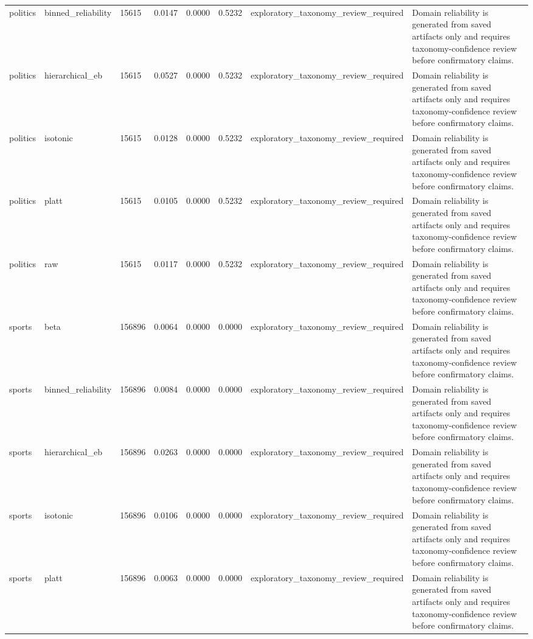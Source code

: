 \begin{tabular}{llllllll}
politics & binned\_reliability & 15615 & 0.0147 & 0.0000 & 0.5232 & exploratory\_taxonomy\_review\_required & Domain reliability is generated from saved artifacts only and requires taxonomy-confidence review before confirmatory claims. \\
politics & hierarchical\_eb & 15615 & 0.0527 & 0.0000 & 0.5232 & exploratory\_taxonomy\_review\_required & Domain reliability is generated from saved artifacts only and requires taxonomy-confidence review before confirmatory claims. \\
politics & isotonic & 15615 & 0.0128 & 0.0000 & 0.5232 & exploratory\_taxonomy\_review\_required & Domain reliability is generated from saved artifacts only and requires taxonomy-confidence review before confirmatory claims. \\
politics & platt & 15615 & 0.0105 & 0.0000 & 0.5232 & exploratory\_taxonomy\_review\_required & Domain reliability is generated from saved artifacts only and requires taxonomy-confidence review before confirmatory claims. \\
politics & raw & 15615 & 0.0117 & 0.0000 & 0.5232 & exploratory\_taxonomy\_review\_required & Domain reliability is generated from saved artifacts only and requires taxonomy-confidence review before confirmatory claims. \\
sports & beta & 156896 & 0.0064 & 0.0000 & 0.0000 & exploratory\_taxonomy\_review\_required & Domain reliability is generated from saved artifacts only and requires taxonomy-confidence review before confirmatory claims. \\
sports & binned\_reliability & 156896 & 0.0084 & 0.0000 & 0.0000 & exploratory\_taxonomy\_review\_required & Domain reliability is generated from saved artifacts only and requires taxonomy-confidence review before confirmatory claims. \\
sports & hierarchical\_eb & 156896 & 0.0263 & 0.0000 & 0.0000 & exploratory\_taxonomy\_review\_required & Domain reliability is generated from saved artifacts only and requires taxonomy-confidence review before confirmatory claims. \\
sports & isotonic & 156896 & 0.0106 & 0.0000 & 0.0000 & exploratory\_taxonomy\_review\_required & Domain reliability is generated from saved artifacts only and requires taxonomy-confidence review before confirmatory claims. \\
sports & platt & 156896 & 0.0063 & 0.0000 & 0.0000 & exploratory\_taxonomy\_review\_required & Domain reliability is generated from saved artifacts only and requires taxonomy-confidence review before confirmatory claims. \\

\end{tabular}
